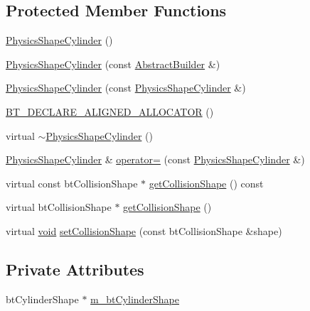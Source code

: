 \subsection*{Protected Member Functions}
\begin{DoxyCompactItemize}
\item 
\mbox{\hyperlink{classnjli_1_1_physics_shape_cylinder_a7e9b42a5baf9eab31f6d3f447eae56f8}{Physics\+Shape\+Cylinder}} ()
\item 
\mbox{\hyperlink{classnjli_1_1_physics_shape_cylinder_afe635fca063da9463ced31e09d241745}{Physics\+Shape\+Cylinder}} (const \mbox{\hyperlink{classnjli_1_1_abstract_builder}{Abstract\+Builder}} \&)
\item 
\mbox{\hyperlink{classnjli_1_1_physics_shape_cylinder_a6faad4aa97c6275c9dae35313e3f8b66}{Physics\+Shape\+Cylinder}} (const \mbox{\hyperlink{classnjli_1_1_physics_shape_cylinder}{Physics\+Shape\+Cylinder}} \&)
\item 
\mbox{\hyperlink{classnjli_1_1_physics_shape_cylinder_ae2dc8177ccf121405a2d3aeaa5a5c513}{B\+T\+\_\+\+D\+E\+C\+L\+A\+R\+E\+\_\+\+A\+L\+I\+G\+N\+E\+D\+\_\+\+A\+L\+L\+O\+C\+A\+T\+OR}} ()
\item 
virtual \mbox{\hyperlink{classnjli_1_1_physics_shape_cylinder_a83539bdbdb5bf4b8e270475070a39199}{$\sim$\+Physics\+Shape\+Cylinder}} ()
\item 
\mbox{\hyperlink{classnjli_1_1_physics_shape_cylinder}{Physics\+Shape\+Cylinder}} \& \mbox{\hyperlink{classnjli_1_1_physics_shape_cylinder_a0d44e40875147bc6999adf0693268099}{operator=}} (const \mbox{\hyperlink{classnjli_1_1_physics_shape_cylinder}{Physics\+Shape\+Cylinder}} \&)
\item 
virtual const bt\+Collision\+Shape $\ast$ \mbox{\hyperlink{classnjli_1_1_physics_shape_cylinder_aa3676c39e8377b6798b034b67ba07d31}{get\+Collision\+Shape}} () const
\item 
virtual bt\+Collision\+Shape $\ast$ \mbox{\hyperlink{classnjli_1_1_physics_shape_cylinder_a9a87d86c692a3b1ce42c68354f312440}{get\+Collision\+Shape}} ()
\item 
virtual \mbox{\hyperlink{_thread_8h_af1e856da2e658414cb2456cb6f7ebc66}{void}} \mbox{\hyperlink{classnjli_1_1_physics_shape_cylinder_aca6f41dfec9b3287717357cbfa57935a}{set\+Collision\+Shape}} (const bt\+Collision\+Shape \&shape)
\end{DoxyCompactItemize}
\subsection*{Private Attributes}
\begin{DoxyCompactItemize}
\item 
bt\+Cylinder\+Shape $\ast$ \mbox{\hyperlink{classnjli_1_1_physics_shape_cylinder_a59ebaac81520be5fee6e86ff8b937737}{m\+\_\+bt\+Cylinder\+Shape}}
\end{DoxyCompactItemize}
